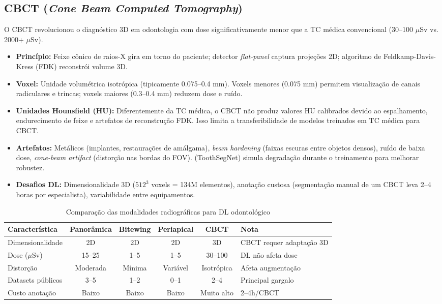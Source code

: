 \subsection{CBCT (\textit{Cone Beam Computed Tomography})}

O CBCT revolucionou o diagnóstico 3D em odontologia com dose significativamente
menor que a TC médica convencional (30--100 $\mu$Sv vs. 2000+ $\mu$Sv).

\begin{itemize}
  \item \textbf{Princípio:} Feixe cônico de raios-X gira em torno do paciente;
        detector \textit{flat-panel} captura projeções 2D; algoritmo de
        Feldkamp-Davis-Kress (FDK) reconstrói volume 3D.
  \item \textbf{Voxel:} Unidade volumétrica isotrópica (tipicamente 0.075--0.4 mm).
        Voxels menores (0.075 mm) permitem visualização de canais radiculares
        e trincas; voxels maiores (0.3--0.4 mm) reduzem dose e ruído.
  \item \textbf{Unidades Hounsfield (HU):} Diferentemente da TC médica, o CBCT
        não produz valores HU calibrados devido ao espalhamento, endurecimento
        de feixe e artefatos de reconstrução FDK. Isso limita a transferibilidade
        de modelos treinados em TC médica para CBCT.
  \item \textbf{Artefatos:} Metálicos (implantes, restaurações de amálgama),
        \textit{beam hardening} (faixas escuras entre objetos densos), ruído
        de baixa dose, \textit{cone-beam artifact} (distorção nas bordas do FOV).
         (ToothSegNet) simula degradação durante o treinamento
        para melhorar robustez.
  \item \textbf{Desafios DL:} Dimensionalidade 3D ($512^3$ voxels = 134M elementos),
        anotação custosa (segmentação manual de um CBCT leva 2--4 horas por
        especialista), variabilidade entre equipamentos.
\end{itemize}

\begin{table}[H]
  \centering
  \caption{Comparação das modalidades radiográficas para DL odontológico}
  \label{tab:modalidades-comp}
  \begin{tabularx}{\textwidth}{lccccX}
    \toprule
    \textbf{Característica} & \textbf{Panorâmica} & \textbf{Bitewing} & \textbf{Periapical} & \textbf{CBCT} & \textbf{Nota} \\
    \midrule
    Dimensionalidade & 2D & 2D & 2D & 3D & CBCT requer adaptação 3D \\
    Dose ($\mu$Sv) & 15--25 & 1--5 & 1--5 & 30--100 & DL não afeta dose \\
    Distorção & Moderada & Mínima & Variável & Isotrópica & Afeta augmentação \\
    Datasets públicos & 3--5 & 1--2 & 0--1 & 2--4 & Principal gargalo \\
    Custo anotação & Baixo & Baixo & Baixo & Muito alto & 2--4h/CBCT \\
    \bottomrule
  \end{tabularx}
\end{table}

